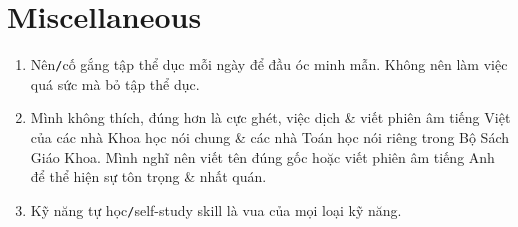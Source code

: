 \documentclass{article}
\numberwithin{equation}{section}
\begin{document}

\section{Miscellaneous}

\begin{enumerate}
	\item Nên\texttt{/}cố gắng tập thể dục mỗi ngày để đầu óc minh mẫn. Không nên làm việc quá sức mà bỏ tập thể dục.
	\item Mình không thích, đúng hơn là cực ghét, việc dịch \& viết phiên âm tiếng Việt của các nhà Khoa học nói chung \& các nhà Toán học nói riêng trong Bộ Sách Giáo Khoa. Mình nghĩ nên viết tên đúng gốc hoặc viết phiên âm tiếng Anh để thể hiện sự tôn trọng \& nhất quán.
	\item Kỹ năng tự học\texttt{/}self-study skill là vua của mọi loại kỹ năng.
\end{enumerate}


\printbibliography[heading=bibintoc]
	
\end{document}
